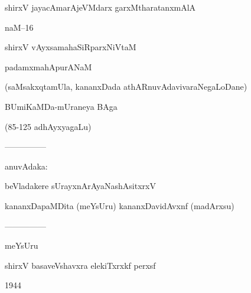 \documentclass{article}
\begin{document}
\begin{center}
shirxV jayacAmarAjeVMdarx garxMtharatanxmAlA
\end{center}

\begin{center}
naM--16
\end{center}

\begin{center}
shirxV vAyxsamahaSiRparxNiVtaM
\end{center}

\begin{center}
padamxmahApurANaM
\end{center}

\begin{center}
(saMsakxqtamUla, kananxDada athARnuvAdavivaraNegaLoDane)
\end{center}

\begin{center}
BUmiKaMDa-mUraneya BAga
\end{center}

\begin{center}
(85-125 adhAyxyagaLu)
\end{center}

\begin{center}
---------------
\end{center}

\begin{center}
anuvAdaka:
\end{center}

\begin{center}
beVladakere sUrayxnArAyaNashAsitxrxV
\end{center}

\begin{center}
kananxDapaMDita (meYsUru) kananxDavidAvxnf (madArxsu)
\end{center}

\begin{center}
---------------
\end{center}

\begin{center}
meYsUru
\end{center}

\begin{center}
shirxV basaveVshavxra elekiTxrxkf perxsf
\end{center}

\begin{center}
1944
\end{center}
\end{document}
